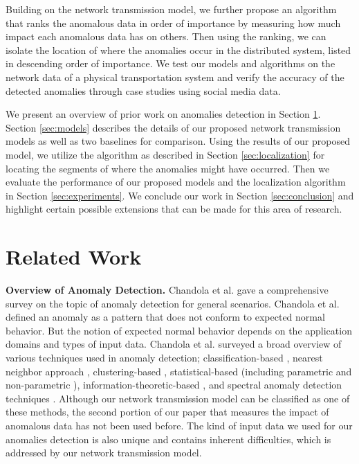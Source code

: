 \documentclass[conference]{IEEEtran.1.8}
\begin{document}
Building on the network transmission model, we further propose an algorithm that ranks the anomalous data in order of importance by measuring how much impact each anomalous data has on others. Then using the ranking, we can isolate the location of where the anomalies occur in the distributed system, listed in descending order of importance. We test our models and algorithms on the network data of a physical transportation system and verify the accuracy of the detected anomalies through case studies using social media data.

We present an overview of prior work on anomalies detection in Section \ref{sec:related}. Section \ref{sec:models} describes the details of our proposed network transmission models as well as two baselines for comparison. Using the results of our proposed model, we utilize the algorithm as described in Section \ref{sec:localization} for locating the segments of where the anomalies might have occurred. Then we evaluate the performance of our proposed models and the localization algorithm in Section \ref{sec:experiments}. We conclude our work in Section \ref{sec:conclusion} and highlight certain possible extensions that can be made for this area of research.


\section{Related Work}
\label{sec:related}

\textbf{Overview of Anomaly Detection.} Chandola et al. \cite{Chandola2009} gave a comprehensive survey on the topic of anomaly detection for general scenarios. Chandola et al. defined an anomaly as a pattern that does not conform to expected normal behavior. But the notion of expected normal behavior depends on the application domains and types of input data. Chandola et al. surveyed a broad overview of various techniques used in anomaly detection; classification-based \cite{Stefano2000, Barbara2001}, nearest neighbor approach \cite{Otey2006}, clustering-based \cite{He2003}, statistical-based (including parametric \cite{Eskin2000} and non-parametric \cite{Chow2002}), information-theoretic-based \cite{Ando2007}, and spectral anomaly detection techniques \cite{Agovic2009}. Although our network transmission model can be classified as one of these methods, the second portion of our paper that measures the impact of anomalous data has not been used before. The kind of input data we used for our anomalies detection is also unique and contains inherent difficulties, which is addressed by our network transmission model.
\end{document}
